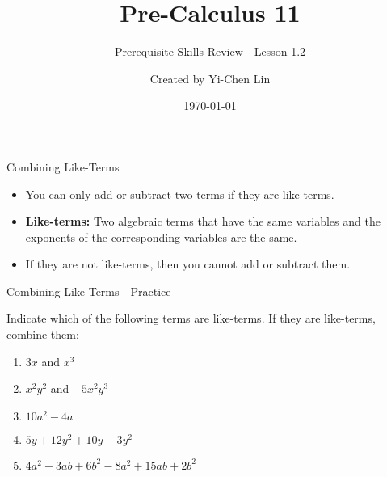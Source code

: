 \documentclass[aspectratio=169]{beamer}
\title{Pre-Calculus 11}
\subtitle{Prerequisite Skills Review - Lesson 1.2}
\author{Created by Yi-Chen Lin}
\date{\today}
\begin{document}
\begin{frame}
    \titlepage
\end{frame}

\begin{frame}{Combining Like-Terms}
    \begin{tcolorbox}[colback=lightgray,colframe=primary,title=Definition]
        \footnotesize
        \begin{itemize}
            \item You can only add or subtract two terms if they are like-terms.
            \item \textbf{Like-terms:} Two algebraic terms that have the same variables and the exponents of the corresponding variables are the same.
            \item If they are not like-terms, then you cannot add or subtract them.
        \end{itemize}
    \end{tcolorbox}
\end{frame}

\begin{frame}{Combining Like-Terms - Practice}
    \begin{tcolorbox}[colback=lightgray,colframe=primary,title=Practice Problems]
        \footnotesize
        Indicate which of the following terms are like-terms. If they are like-terms, combine them:
        \begin{enumerate}
            \setlength{\itemsep}{0.5em}
            \item $3x$ and $x^3$
            \item $x^2y^2$ and $-5x^2y^3$
            \item $10a^2 - 4a$
            \item $5y + 12y^2 + 10y - 3y^2$
            \item $4a^2 - 3ab + 6b^2 - 8a^2 + 15ab + 2b^2$
        \end{enumerate}
    \end{tcolorbox}
\end{frame}
\end{document}
